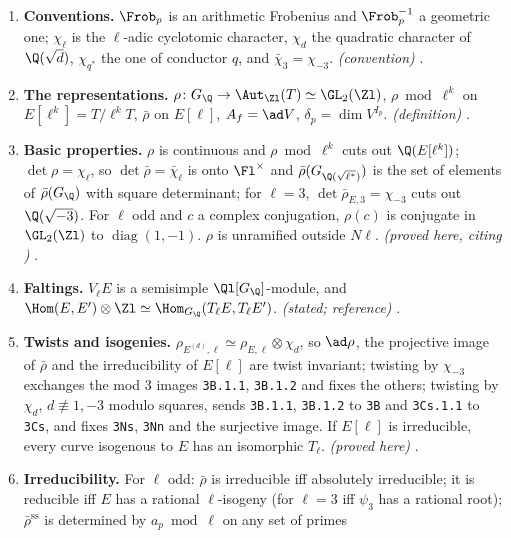 \begin{enumerate}[label=\textbf{\thechapter.\arabic*}]
\item \textbf{Conventions.} $\Frob_p$ is an arithmetic Frobenius and $\Frob_p^{-1}$ a geometric one; $\chi_\ell$ is the
$\ell$-adic cyclotomic character, $\chi_d$ the quadratic character of $\Q(\sqrt d)$, $\chi_{q^*}$ the one of conductor $q$, and
$\bar\chi_3=\chi_{-3}$. \emph{(convention)} .
\item \textbf{The representations.} $\rho\colon G_\Q\to\Aut_{\Zl}(T)\simeq\GL_2(\Zl)$, $\rho\bmod\ell^k$ on $E[\ell^k]=T/\ell^kT$, $\bar\rho$ on
$E[\ell]$, $A_f=\ad V$, $\delta_p=\dim V^{I_p}$. \emph{(definition)} .
\item \textbf{Basic properties.} $\rho$ is continuous and $\rho\bmod\ell^k$ cuts out $\Q(E[\ell^k])$; $\det\rho=\chi_\ell$, so $\det\bar\rho=\bar\chi_\ell$
is onto $\Fl^\times$ and $\bar\rho(G_{\Q(\sqrt{\ell^*})})$ is the set of elements of $\bar\rho(G_\Q)$ with square determinant; for $\ell=3$,
$\det\bar\rho_{E,3}=\chi_{-3}$ cuts out $\Q(\sqrt{-3})$. For $\ell$ odd and $c$ a complex conjugation, $\rho(c)$ is conjugate in $\GL_2(\Zl)$ to
$\operatorname{diag}(1,-1)$. $\rho$ is unramified outside $N\ell$. \emph{(proved here, citing )}
.
\item \textbf{Faltings.} $V_\ell E$ is a semisimple $\Ql[G_\Q]$-module, and $\Hom(E,E')\otimes\Zl\simeq\Hom_{G_\Q}(T_\ell E,T_\ell E')$.
\emph{(stated; reference)} .
\item \textbf{Twists and isogenies.} $\rho_{E^{(d)},\ell}\simeq\rho_{E,\ell}\otimes\chi_d$, so $\ad\rho$, the projective image of $\bar\rho$ and the
irreducibility of $E[\ell]$ are twist invariant; twisting by $\chi_{-3}$ exchanges the mod $3$ images \texttt{3B.1.1}, \texttt{3B.1.2} and
fixes the others; twisting by $\chi_d$, $d\not\equiv1,-3$ modulo squares, sends \texttt{3B.1.1}, \texttt{3B.1.2} to \texttt{3B} and
\texttt{3Cs.1.1} to \texttt{3Cs}, and fixes \texttt{3Ns}, \texttt{3Nn} and the surjective image. If $E[\ell]$ is irreducible, every curve
isogenous to $E$ has an isomorphic $T_\ell$. \emph{(proved here)} .
\item \textbf{Irreducibility.} For $\ell$ odd: $\bar\rho$ is irreducible iff absolutely irreducible; it is reducible iff $E$ has a rational
$\ell$-isogeny (for $\ell=3$ iff $\psi_3$ has a rational root); $\bar\rho^{\mathrm{ss}}$ is determined by $a_p\bmod\ell$ on any set of primes

\end{enumerate}
